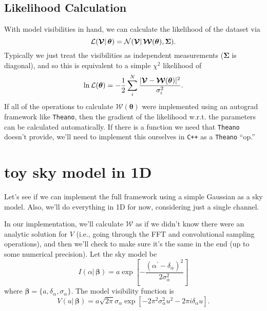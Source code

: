 \documentclass[modern]{aastex62}
\newcommand{\vd}{\boldsymbol{\mathcal{V}}} %
\newcommand{\vm}{\boldsymbol{\mathcal{W}}} %
\newcommand{\bbeta}{\boldsymbol{\beta}} %
\newcommand{\btheta}{\boldsymbol{\theta}} %
\begin{document}
\subsection{Likelihood Calculation}

With model visibilities in hand, we can calculate the likelihood of the dataset via
\begin{equation}
    {\cal L}(\vd |\, \boldsymbol{\theta}) = {\cal N}(\boldsymbol{\mathcal{V}} |\, \boldsymbol{\mathcal{W}}(\boldsymbol{\theta}), \boldsymbol{\Sigma}).
\end{equation}
Typically we just treat the visibilities as independent measurements ($\boldsymbol{\Sigma}$ is diagonal), and so this is equivalent to a simple $\chi^2$ likelihood of
\begin{equation}
    \ln {\cal L}(\btheta) = - \frac{1}{2} \sum_i^N \frac{|\vd - \vm(\btheta)|^2}{\sigma_i^2}.
\end{equation}
If all of the operations to calculate $\vm(\btheta)$ were implemented using an autograd framework like \texttt{Theano}, then the gradient of the likelihood w.r.t. the parameters can be calculated automatically. If there is a function we need that \texttt{Theano} doesn't provide, we'll need to implement this ourselves in \texttt{C++} as a \texttt{Theano} ``op.''

\section{toy sky model in 1D}
Let's see if we can implement the full framework using a simple Gaussian as a sky model. Also, we'll do everything in 1D for now, considering just a single channel.

In our implementation, we'll calculate $\vm$ as if we didn't know there were an analytic solution for $V$ (i.e., going through the FFT and convolutional sampling operations), and then we'll check to make sure it's the same in the end (up to some numerical precision). Let the sky model be
\begin{equation}
I(\alpha |\, \boldsymbol{\beta}) = a \exp \left [ -  \frac{(\alpha^\prime - \delta_\alpha)^2}{2 \sigma_\alpha^2} \right ]
\end{equation}
where $\bbeta = \{a, \delta_\alpha, \sigma_\alpha\}$. The model visibility function is 
\begin{equation}
V(u |\, \boldsymbol{\beta}) = a \sqrt{2 \pi} \sigma_\alpha \exp \left [ -2 \pi^2 \sigma_\alpha^2 u^2 - 2 \pi i \delta_\alpha u \right ].
\end{equation}
\end{document}
